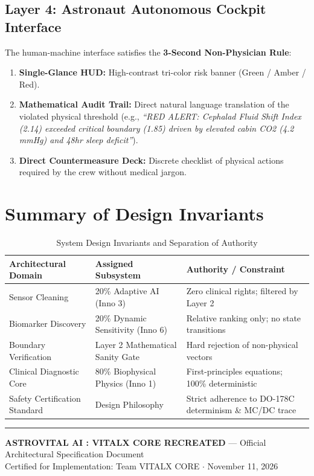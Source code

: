 \documentclass[11pt,a4paper]{article}
\begin{document}
\subsection{Layer 4: Astronaut Autonomous Cockpit Interface}
The human-machine interface satisfies the \textbf{3-Second Non-Physician Rule}:
\begin{enumerate}
    \item \textbf{Single-Glance HUD:} High-contrast tri-color risk banner (Green / Amber / Red).
    \item \textbf{Mathematical Audit Trail:} Direct natural language translation of the violated physical threshold (e.g., \textit{``RED ALERT: Cephalad Fluid Shift Index (2.14) exceeded critical boundary (1.85) driven by elevated cabin CO2 (4.2 mmHg) and 48hr sleep deficit''}).
    \item \textbf{Direct Countermeasure Deck:} Discrete checklist of physical actions required by the crew without medical jargon.
\end{enumerate}

\section{Summary of Design Invariants}

\begin{table}[h!]
\centering
\small
\begin{tabular}{@{}lll@{}}
\toprule
\textbf{Architectural Domain} & \textbf{Assigned Subsystem} & \textbf{Authority / Constraint} \\ \midrule
Sensor Cleaning & 20\% Adaptive AI (Inno 3) & Zero clinical rights; filtered by Layer 2 \\
Biomarker Discovery & 20\% Dynamic Sensitivity (Inno 6) & Relative ranking only; no state transitions \\
Boundary Verification & Layer 2 Mathematical Sanity Gate & Hard rejection of non-physical vectors \\
Clinical Diagnostic Core & 80\% Biophysical Physics (Inno 1) & First-principles equations; 100\% deterministic \\
Safety Certification Standard & Design Philosophy & Strict adherence to DO-178C determinism \& MC/DC trace \\ \bottomrule
\end{tabular}
\caption{System Design Invariants and Separation of Authority}
\end{table}

\vfill
\noindent\rule{\textwidth}{0.4pt}
\begin{center}
\footnotesize \textbf{ASTROVITAL AI : VITALX CORE RECREATED} --- Official Architectural Specification Document \\
Certified for Implementation: Team VITALX CORE $\cdot$ November 11, 2026
\end{center}
\end{document}
